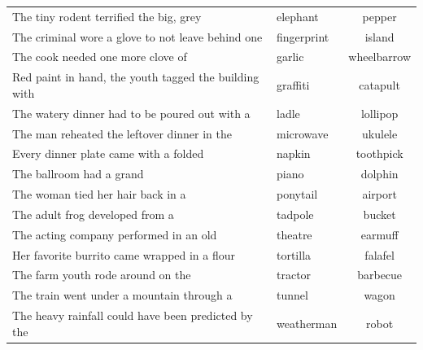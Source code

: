 \begin{table}[!ht]
\begin{tabular}{llc}
The tiny rodent terrified the big, grey                                      & elephant    & pepper      \\
The criminal wore a glove to not leave behind one                            & fingerprint & island      \\
The cook needed one more clove of                                            & garlic      & wheelbarrow \\
Red paint in hand, the youth tagged the building with                        & graffiti    & catapult    \\
The watery dinner had to be poured out with a                                & ladle       & lollipop    \\
The man reheated the leftover dinner in the                                  & microwave   & ukulele     \\
Every dinner plate came with a folded                                        & napkin      & toothpick   \\
The ballroom had a grand                                                     & piano       & dolphin     \\
The woman tied her hair back in a                                            & ponytail    & airport     \\
The adult frog developed from a                                              & tadpole     & bucket      \\
The acting company performed in an old                                       & theatre     & earmuff     \\
Her favorite burrito came wrapped in a flour                                & tortilla    & falafel     \\
The farm youth rode around on the                                            & tractor     & barbecue    \\
The train went under a mountain through a                                    & tunnel      & wagon       \\
The heavy rainfall could have been predicted by the                          & weatherman  & robot      \\
\bottomrule
\end{tabular}
\end{table}

